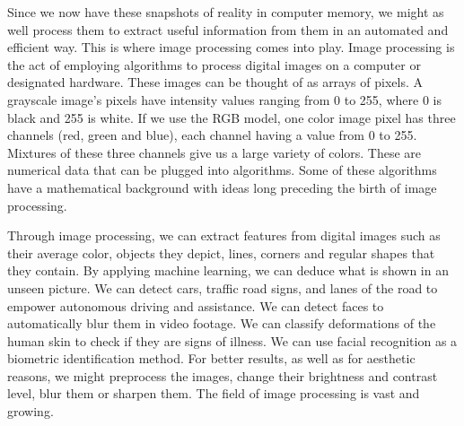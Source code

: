 Since we now have these snapshots of reality in computer memory, we might as well process them to extract useful information from them in an automated and efficient way. This is where image processing comes into play. Image processing is the act of employing algorithms to process digital images on a computer or designated hardware. These images can be thought of as arrays of pixels. A grayscale image's pixels have intensity values ranging from 0 to 255, where 0 is black and 255 is white. If we use the RGB model, one color image pixel has three channels (red, green and blue), each channel having a value from 0 to 255.  Mixtures of these three channels give us a large variety of colors. These are numerical data that can be plugged into algorithms. Some of these algorithms have a mathematical background with ideas long preceding the birth of image processing.

Through image processing, we can extract features from digital images such as their average color, objects they depict, lines, corners and regular shapes that they contain. By applying machine learning, we can deduce what is shown in an unseen picture. We can detect cars, traffic road signs, and lanes of the road to empower autonomous driving and assistance. We can detect faces to automatically blur them in video footage. We can classify deformations of the human skin to check if they are signs of illness. We can use facial recognition as a biometric identification method. For better results, as well as for aesthetic reasons, we might preprocess the images, change their brightness and contrast level, blur them or sharpen them. The field of image processing is vast and growing.
